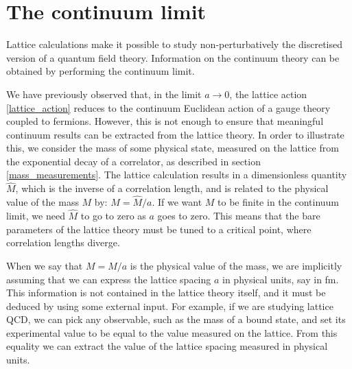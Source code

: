 \section{The continuum limit}

Lattice calculations make it possible to study non-perturbatively the discretised version of a quantum field theory. Information on the continuum theory can be obtained by performing the continuum limit.

We have previously observed that, in the limit $a \to 0$, the lattice action \ref{lattice_action} reduces to the continuum Euclidean action of a gauge theory coupled to fermions. However, this is not enough to ensure that meaningful continuum results can be extracted from the lattice theory.
In order to illustrate this, we consider the mass of some physical state, measured on the lattice from the exponential decay of a correlator, as described in section \ref{mass_measurements}. The lattice calculation results in a dimensionless quantity $\hat M$, which is the inverse of a correlation length, and is related to the physical value of the mass $M$ by: $M = \hat M/a$. If we want $M$ to be finite in the continuum limit, we need $\hat M$ to go to zero as $a$ goes to zero. This means that the bare parameters of the lattice theory must be tuned to a critical point, where correlation lengths diverge.

When we say that $M = \hat M /a$ is the physical value of the mass, we are implicitly assuming that we can express the lattice spacing $a$ in physical units, say in fm. This information is not contained in the lattice theory itself, and it must be deduced by using some external input. For example, if we are studying lattice QCD, we can pick any observable, such as the mass of a bound state, and set its experimental value to be equal to the value measured on the lattice. From this equality we can extract the value of the lattice spacing measured in physical units. 

